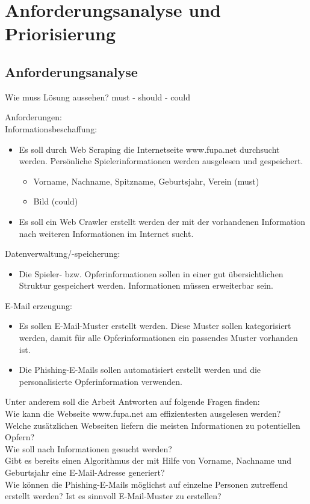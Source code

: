 
\chapter{Anforderungsanalyse und Priorisierung}  %
\label{cha:} %
\section{Anforderungsanalyse} %
\label{sec:} %
Wie muss Lösung aussehen? must - should - could

Anforderungen:\\

Informationsbeschaffung:
\begin{itemize}
\item Es soll durch Web Scraping die Internetseite www.fupa.net durchsucht werden. Persönliche Spielerinformationen werden ausgelesen und gespeichert.
\begin{itemize}
	\item Vorname, Nachname, Spitzname, Geburtsjahr, Verein (must)
	\item Bild (could)
\end{itemize}
\item Es soll ein Web Crawler erstellt werden der mit der vorhandenen Information nach weiteren Informationen im Internet sucht.
\end{itemize}

Datenverwaltung/-speicherung:
\begin{itemize}
\item Die Spieler- bzw. Opferinformationen sollen in einer gut übersichtlichen Struktur gespeichert werden. Informationen müssen erweiterbar sein.
\end{itemize}

E-Mail erzeugung:
\begin{itemize}
\item Es sollen E-Mail-Muster erstellt werden. Diese Muster sollen kategorisiert werden, damit für alle Opferinformationen ein passendes Muster vorhanden ist.
\item Die Phishing-E-Mails sollen automatisiert erstellt werden und die personalisierte Opferinformation verwenden.
\end{itemize}

Unter anderem soll die Arbeit Antworten auf folgende Fragen finden:\\
Wie kann die Webseite www.fupa.net am effizientesten ausgelesen werden?\\
Welche zusätzlichen Webseiten liefern die meisten Informationen zu potentiellen Opfern?\\
Wie soll nach Informationen gesucht werden?\\
Gibt es bereits einen Algorithmus der mit Hilfe von Vorname, Nachname und Geburtsjahr eine E-Mail-Adresse generiert?\\
Wie können die Phishing-E-Mails möglichst auf einzelne Personen zutreffend erstellt werden? Ist es sinnvoll E-Mail-Muster zu erstellen?\\

